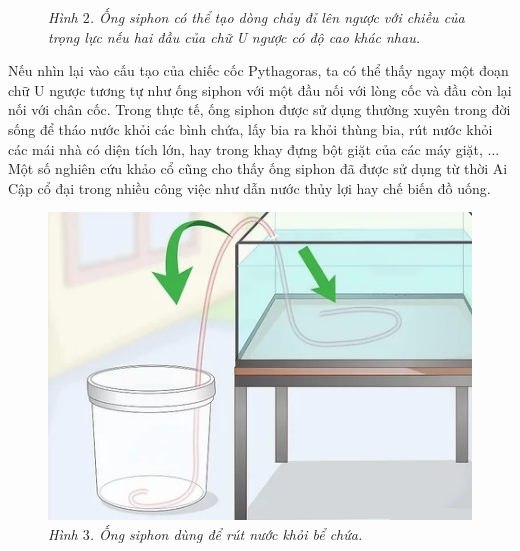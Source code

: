 \begin{multicols}{2}
\begin{figure}[H]
		\caption{\small\textit{\color{quantoan}Hình $2$. Ống siphon có thể tạo dòng chảy đỉ lên ngược với chiều của trọng lực nếu hai đầu của chữ U ngược có độ cao khác nhau.}}
		\vspace*{-10pt}
	\end{figure}
	Nếu nhìn lại vào cấu tạo của chiếc cốc Pythagoras, ta có thể thấy ngay một đoạn chữ U ngược tương tự như ống siphon với một đầu nối với lòng cốc và đầu còn lại nối với chân cốc. Trong thực tế, ống siphon được sử dụng thường xuyên trong đời sống để tháo nước khỏi các bình chứa, lấy bia ra khỏi thùng bia, rút nước khỏi các mái nhà có diện tích lớn, hay trong khay đựng bột giặt của các máy giặt, ...  Một số nghiên cứu khảo cổ cũng cho thấy ống siphon đã được sử dụng từ thời Ai Cập cổ đại trong nhiều công việc như dẫn nước thủy lợi hay chế biến đồ uống. 
	\begin{figure}[H]
		\vspace*{-5pt}
		\centering
		\captionsetup{labelformat= empty, justification=centering}
		\includegraphics[width= 1\linewidth]{3}
		\caption{\small\textit{\color{quantoan}Hình $3$. Ống siphon dùng để rút nước khỏi bể chứa.}}
		\vspace*{-10pt}
	\end{figure}
\end{multicols}
